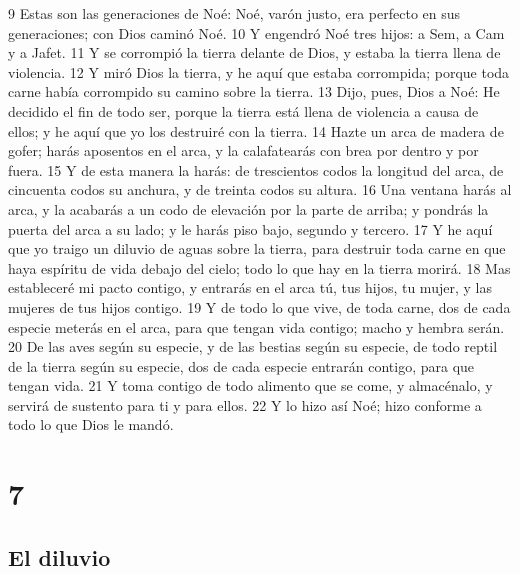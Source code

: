 9 Estas son las generaciones de Noé: Noé, varón justo, era perfecto en sus generaciones; con Dios caminó Noé.
10 Y engendró Noé tres hijos: a Sem, a Cam y a Jafet.
11 Y se corrompió la tierra delante de Dios, y estaba la tierra llena de violencia.
12 Y miró Dios la tierra, y he aquí que estaba corrompida; porque toda carne había corrompido su camino sobre la tierra.
13 Dijo, pues, Dios a Noé: He decidido el fin de todo ser, porque la tierra está llena de violencia a causa de ellos; y he aquí que yo los destruiré con la tierra.
14 Hazte un arca de madera de gofer; harás aposentos en el arca, y la calafatearás con brea por dentro y por fuera.
15 Y de esta manera la harás: de trescientos codos la longitud del arca, de cincuenta codos su anchura, y de treinta codos su altura.
16 Una ventana harás al arca, y la acabarás a un codo de elevación por la parte de arriba; y pondrás la puerta del arca a su lado; y le harás piso bajo, segundo y tercero.
17 Y he aquí que yo traigo un diluvio de aguas sobre la tierra, para destruir toda carne en que haya espíritu de vida debajo del cielo; todo lo que hay en la tierra morirá.
18 Mas estableceré mi pacto contigo, y entrarás en el arca tú, tus hijos, tu mujer, y las mujeres de tus hijos contigo.
19 Y de todo lo que vive, de toda carne, dos de cada especie meterás en el arca, para que tengan vida contigo; macho y hembra serán.
20 De las aves según su especie, y de las bestias según su especie, de todo reptil de la tierra según su especie, dos de cada especie entrarán contigo, para que tengan vida.
21 Y toma contigo de todo alimento que se come, y almacénalo, y servirá de sustento para ti y para ellos.
22 Y lo hizo así Noé; hizo conforme a todo lo que Dios le mandó.

\chapter{7}

\section*{El diluvio}

